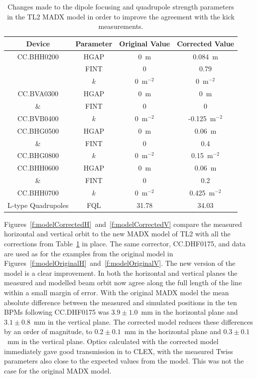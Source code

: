 \begin{table}
  \begin{center}
    \begin{tabular}{|c c c c|}
	    \hline
        Device & Parameter & Original Value & Corrected Value\\ \hline
		CC.BHH0200 & HGAP & 0~m & 0.084~m \\
		 	       & FINT & 0 & 0.79 \\
		           & \(k\) & 0~\(\mathrm{m^{-2}}\) & 0~\(\mathrm{m^{-2}}\) \\ \hline
		CC.BVA0300   & HGAP & 0~m & 0~m \\
		 	 \&      & FINT & 0 & 0 \\
		CC.BVB0400   & \(k\) & 0~\(\mathrm{m^{-2}}\) & -0.125~\(\mathrm{m^{-2}}\) \\ \hline
		CC.BHG0500   & HGAP & 0~m & 0.06~m \\
		 	 \&      & FINT & 0 & 0.4 \\
		CC.BHG0800   & \(k\) & 0~\(\mathrm{m^{-2}}\) & 0.15~\(\mathrm{m^{-2}}\) \\ \hline
		CC.BHH0600   & HGAP & 0~m & 0.06~m \\
		 	 \&      & FINT & 0 & 0.2 \\
		CC.BHH0700   & \(k\) & 0~\(\mathrm{m^{-2}}\) & 0.425~\(\mathrm{m^{-2}}\) \\ \hline
		L-type Quadrupoles & FQL & 31.78 & 34.03 \\
	   \hline
    \end{tabular}
    \caption{Changes made to the dipole focusing and quadrupole strength parameters in the TL2 MADX model in order to improve the agreement with the kick measurements.}
  	\label{t:tl2ModelChanges}
  \end{center}
\end{table}

Figures~\ref{f:modelCorrectedH}~and~\ref{f:modelCorrectedV} compare the measured horizontal and vertical orbit to the new MADX model of TL2 with all the corrections from Table~\ref{t:tl2ModelChanges} in place. The same corrector, CC.DHF0175, and data are used as for the examples from the original model in Figures~\ref{f:modelOriginalH}~and~\ref{f:modelOriginalV}. The new version of the model is a clear improvement. In both the horizontal and vertical planes the measured and modelled beam orbit now agree along the full length of the line within a small margin of error. With the original MADX model the mean absolute difference between the measured and simulated positions in the ten BPMs following CC.DHF0175 was \(3.9\pm1.0\)~mm in the horizontal plane and \(3.1\pm0.8\)~mm in the vertical plane. The corrected model reduces these differences by an order of magnitude, to \(0.2\pm0.1\)~mm in the horizontal plane and \(0.3\pm0.1\)~mm in the vertical plane. Optics calculated with the corrected model immediately gave good transmission in to CLEX, with the measured Twiss parameters also close to the expected values from the model. This was not the case for the original MADX model.



